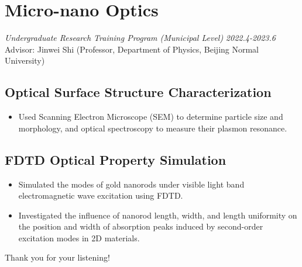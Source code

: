 \documentclass[a4paper, 12pt]{ctexart}
\begin{document}
\section*{Micro-nano Optics} %
\textit{Undergraduate Research Training Program (Municipal Level)} \hfill \textit{2022.4-2023.6} \\ %
Advisor: Jinwei Shi (Professor, Department of Physics, Beijing Normal University) %

\subsection*{Optical Surface Structure Characterization} %
\begin{itemize}
    \item Used Scanning Electron Microscope (SEM) to determine particle size and morphology, and optical spectroscopy to measure their plasmon resonance. %
\end{itemize}

\subsection*{FDTD Optical Property Simulation} %
\begin{itemize}
    \item Simulated the modes of gold nanorods under visible light band electromagnetic wave excitation using FDTD. %
    \item Investigated the influence of nanorod length, width, and length uniformity on the position and width of absorption peaks induced by second-order excitation modes in 2D materials. %
\end{itemize}


\newpage
\begin{center}
    \vspace{5em} %
    \Large
    Thank you for your listening! %
\end{center}
\end{document}
